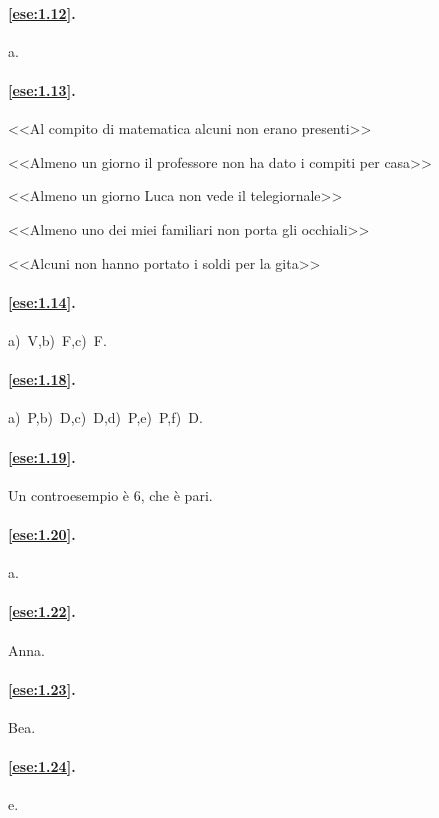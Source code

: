 \paragraph{\ref{ese:1.12}.}
a.

\paragraph{\ref{ese:1.13}.}
\begin{enumeratea}
\item <<Al compito di matematica alcuni non erano presenti>>
\item <<Almeno un giorno il professore non ha dato i compiti per casa>>
\item <<Almeno un giorno Luca non vede il telegiornale>>
\item <<Almeno uno dei miei familiari non porta gli occhiali>>
\item <<Alcuni non hanno portato i soldi per la gita>>
\end{enumeratea}

\paragraph{\ref{ese:1.14}.}
a)~V,\quad b)~F,\quad c)~F.

\paragraph{\ref{ese:1.18}.}
a)~P,\quad b)~D,\quad c)~D,\quad d)~P,\quad e)~P,\quad f)~D.

\paragraph{\ref{ese:1.19}.}
Un controesempio è 6, che è pari.

\paragraph{\ref{ese:1.20}.}
a.

\paragraph{\ref{ese:1.22}.}
Anna.

\paragraph{\ref{ese:1.23}.}
Bea.

\paragraph{\ref{ese:1.24}.}
e.

